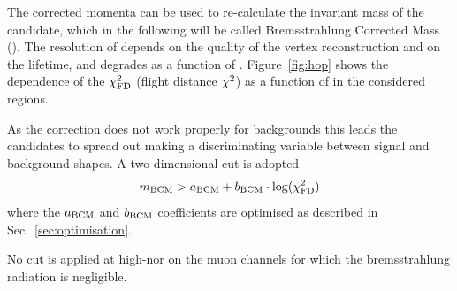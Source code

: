 The corrected momenta can be used to re-calculate the invariant mass of the \Bz candidate, which in the following will be
called Bremsstrahlung Corrected Mass (\mbcm). The resolution of \mbcm depends on the quality of the vertex reconstruction
and on the \Bz lifetime, and degrades as a function of \qsq. Figure~\ref{fig:hop} shows the dependence of the \Bz $\chi^2_{\rm FD}$ 
(flight distance $\chi^2$) as a function of \mbcm in the considered \qsq regions. 

As the correction does not work properly for backgrounds this leads the candidates to spread out making \mbcm 
a discriminating variable between signal and background shapes. A two-dimensional cut is adopted
%
$$m_{\rm BCM} > a_{\rm BCM} + b_{\rm BCM} \cdot \log(\chi^2_{\rm FD})$$
%
where the $a_{\rm BCM}$ and $b_{\rm BCM}$ coefficients are optimised as described in Sec.~\ref{sec:optimisation}.

No cut is applied at high-\qsq nor on the muon channels for which the bremsstrahlung radiation is negligible.




